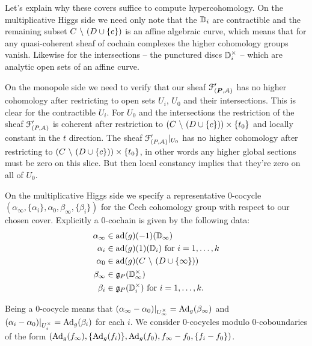 \documentclass[10pt, oneside]{article}
\renewcommand{\ad}{\mr{ad}}
\begin{document}
Let's explain why these covers suffice to compute hypercohomology.  On the multiplicative Higgs side we need only note that the $\mathbb{D}_i$ are contractible and the remaining subset $C \ \backslash \  (D \cup \{c\})$ is an affine algebraic curve, which means that for any quasi-coherent sheaf of cochain complexes the higher cohomology groups vanish.  Likewise for the intersections -- the punctured discs $\mathbb{D}_i^\times$ -- which are analytic open sets of an affine curve.

On the monopole side we need to verify that our sheaf $\mathcal{F}'_{(\boldsymbol{P},\mathcal{A})}$ has no higher cohomology after restricting to open sets $U_i$, $U_0$ and their intersections.  This is clear for the contractible $U_i$.  For $U_0$ and the intersections the restriction of the sheaf  $\mathcal{F}'_{(P,\mathcal{A})}$ is coherent after restriction to $(C \ \backslash \  (D \cup \{c\})) \times \{t_0\}$ and locally constant in the $t$ direction.  The sheaf $\mathcal{F}'_{(P,\mathcal{A})}|_{U_0}$ has no higher cohomology after restricting to $(C \ \backslash \  (D \cup \{c\})) \times \{t_0\}$, in other words any higher global sections must be zero on this slice.  But then local constancy implies that they're zero on all of $U_0$. 

On the multiplicative Higgs side we specify a representative 0-cocycle $(\alpha_\infty, \{\alpha_i\}, \alpha_0, \beta_\infty, \{\beta_i\})$ for the \v Cech cohomology group with respect to our chosen cover.  Explicitly a 0-cochain is given by the following data:
\begin{align*}
 \alpha_\infty &\in \ad(g)(-1)(\bb D_\infty) \\
 \alpha_i &\in \ad(g)(1)(\bb D_i) \text{ for } i = 1,\ldots,k \\
 \alpha_0 &\in \ad(g)(C \bs (D \cup \{\infty\})) \\
 \beta_\infty &\in \gg_P(\bb D^\times_\infty) \\
 \beta_i &\in \gg_P(\bb D^\times_i) \text{ for } i=1,\ldots,k.
\end{align*}

Being a 0-cocycle means that $(\alpha_\infty - \alpha_0)|_{U^\times_\infty} = \mathrm{Ad}_g(\beta_\infty)$ and $(\alpha_i - \alpha_0)|_{U^\times_i} = \mathrm{Ad}_g(\beta_i)$ for each $i$.  We consider 0-cocycles modulo 0-coboundaries of the form $(\mathrm{Ad}_g(f_\infty), \{\mathrm{Ad}_g(f_i)\}, \mathrm{Ad}_g(f_0), f_\infty -  f_0, \{f_i - f_0\})$.  
\end{document}
